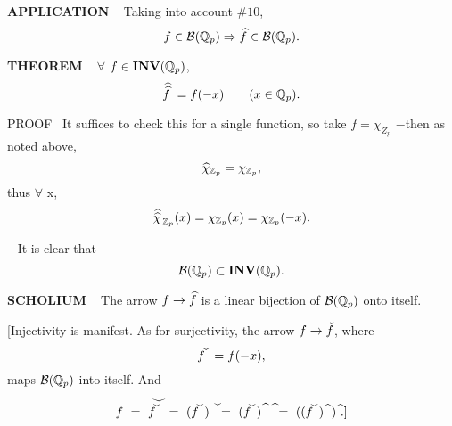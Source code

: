 \vspace{0.1cm}

\begin{x}{\small\bf APPLICATION} \ %
Taking into account $\# 10$, 
\[
f \in \mathcal{B}(\mathbb{Q}_p) \Rightarrow \widehat{f} \in \mathcal{B}(\mathbb{Q}_p). 
\]
\end{x}

\vspace{0.1cm}

\begin{x}{\small\bf THEOREM} \ %
$\forall$ $f \in \mathbf{INV}(\mathbb{Q}_p)$, 
\[
\widehat{\widehat{f}\hspace{0.1cm}} = f(-x)	\qquad (x \in \mathbb{Q}_p).
\]

\vspace{0.1cm} 

PROOF \ 
It suffices to check this for a single function, so take $f = \chi_{Z_p}$ $-$then as noted above,
\[
\widehat{\chi}_{\mathbb{Z}_p} = \chi_{\mathbb{Z}_p},
\]
thus $\forall$ x,
\[
\widehat{\widehat{\chi}\hspace{0.05cm}}_{\mathbb{Z}_p}(x) = \chi_{\mathbb{Z}_p} (x) =  \chi_{\mathbb{Z}_p} (-x).
\]
\end{x}
\vspace{0.1cm}

\begin{x}{\small\bf {}} \ %
It is clear that
\[
\mathcal{B}(\mathbb{Q}_p) \subset \mathbf{INV}(\mathbb{Q}_p).
\]
\end{x}

\vspace{0.1cm}


\begin{x}{\small\bf SCHOLIUM} \ %
The arrow $f \rightarrow \widehat{f}$ is a linear bijection of $\mathcal{B}(\mathbb{Q}_p)$ onto itself.

[Injectivity is manifest.  
As for surjectivity, the arrow $f \rightarrow \check{f}$, where
\[
\widecheck{f\hspace{0.05cm}} = f(-x),
\]
maps $\mathcal{B}(\mathbb{Q}_p)$ into itself.  And
\[
f \ 
=\ \widecheck{\widecheck{f\hspace{0.05cm}}} 
=\  (\widecheck{f\hspace{0.05cm}}) \raisebox{0.22cm}{$\text{ }\widecheck{}$}
=\  (\widecheck{f\hspace{0.05cm}})    \raisebox{0.11cm}{$\text{ }\widehat{} \hspace{0.15cm}\text{ }\widehat{}$}
=\  ((\widecheck{f\hspace{0.05cm}}) 
\raisebox{0.08cm}{$\text{ }\widehat{}$} \hspace{0.1cm} )
\raisebox{0.08cm}{$\text{ }\widehat{}$}.]
\]
\end{x}



